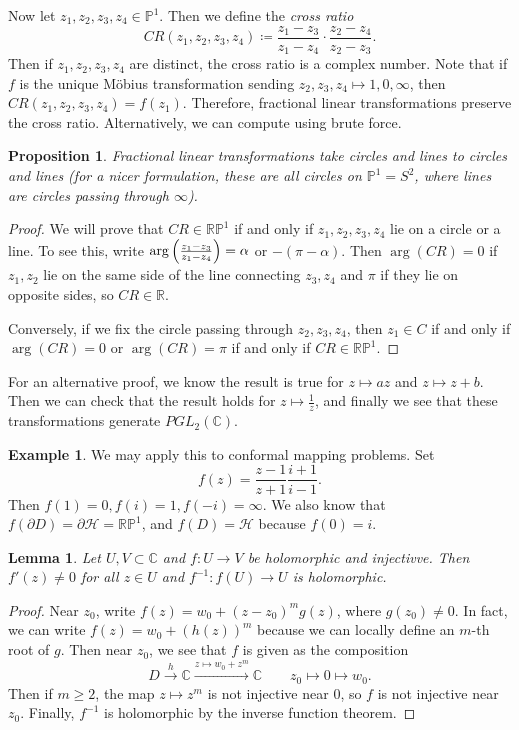 \documentclass[leqno, openany]{memoir}
\newtheorem{prop}[thm]{Proposition}
\newtheorem{lem}[thm]{Lemma}
\theoremstyle{definition}
\newtheorem{exm}[thm]{Example}
\theoremstyle{remark}
\theoremstyle{plain}
\theoremstyle{definition}
\theoremstyle{remark}
\newcommand{\R}{\mathbb{R}}
\newcommand{\C}{\mathbb{C}}
\renewcommand{\P}{\mathbb{P}}
\newcommand{\mc}[1]{\mathcal{#1}}
\begin{document}
Now let $z_1, z_2, z_3, z_4 \in \P^1$. Then we define the \textit{cross ratio}
\[ CR(z_1, z_2, z_3, z_4) \coloneqq \frac{z_1 - z_3}{z_1 - z_4} \cdot \frac{z_2
- z_4}{z_2 - z_3}. \] Then if $z_1, z_2, z_3, z_4$ are distinct, the cross
ratio is a complex number. Note that if $f$ is the unique M\"obius
transformation sending $z_2, z_3, z_4 \mapsto 1,0, \infty$, then $CR(z_1, z_2,
z_3, z_4) = f(z_1)$. Therefore, fractional linear transformations preserve the
cross ratio. Alternatively, we can compute using brute force.

\begin{prop} Fractional linear transformations take circles and lines to
circles and lines (for a nicer formulation, these are all circles on $\P^1 =
S^2$, where lines are circles passing through $\infty$).  \end{prop}

\begin{proof} We will prove that $CR \in \R \P^1$ if and only if $z_1, z_2,
    z_3, z_4$ lie on a circle or a line. To see this, write
    $\arg\qty(\frac{z_1-z_3}{z_1-z_4}) = \alpha$ or $-(\pi-\alpha)$. Then
    $\arg(CR) = 0$ if $z_1, z_2$ lie on the same side of the line connecting
    $z_3, z_4$ and $\pi$ if they lie on opposite sides, so $CR \in \R$. 

    Conversely, if we fix the circle passing through $z_2, z_3, z_4$, then $z_1
\in C$ if and only if $\arg(CR) = 0$ or $\arg(CR) = \pi$ if and only if $CR \in
\R\P^1$.  \end{proof}

For an alternative proof, we know the result is true for $z \mapsto az$ and $z
\mapsto z + b$. Then we can check that the result holds for $z \mapsto
\frac{1}{z}$, and finally we see that these transformations generate
$PGL_2(\C)$.

\begin{exm} We may apply this to conformal mapping problems. Set \[ f(z) =
\frac{z-1}{z+1} \frac{i+1}{i-1}. \] Then $f(1) = 0, f(i) = 1, f(-i) = \infty$.
We also know that $f(\partial D) = \partial \mc{H} = \R\P^1$, and $f(D) =
\mc{H}$ because $f(0) = i$.  \end{exm}

\begin{lem} Let $U, V \subset \C$ and $f \colon U \to V$ be holomorphic and
injectivve. Then $f'(z) \neq 0$ for all $z \in U$ and $f^{-1} \colon f(U) \to
U$ is holomorphic.  \end{lem}

\begin{proof} Near $z_0$, write $f(z) = w_0 + {(z-z_0)}^m g(z)$, where $g(z_0)
    \neq 0$. In fact, we can write $f(z) = w_0 + {(h(z))}^m$ because we can
    locally define an $m$-th root of $g$. Then near $z_0$, we see that $f$ is
    given as the composition \[ D \xrightarrow{h} \C \xrightarrow{z \mapsto w_0
    + z^m} \C \qquad z_0 \mapsto 0 \mapsto w_0. \] Then if $m \geq 2$, the map
    $z \mapsto z^m$ is not injective near $0$, so $f$ is not injective near
    $z_0$. Finally, $f^{-1}$ is holomorphic by the inverse function theorem.
\end{proof}
\end{document}
